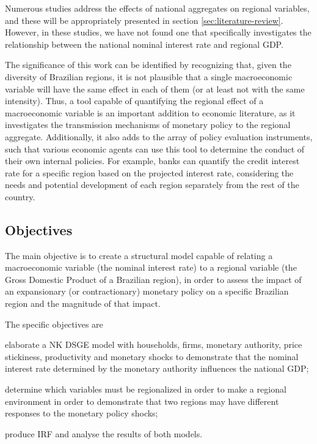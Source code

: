 \documentclass[
	thesis.tex
	]{subfiles}
\begin{document}
	Numerous studies address the effects of national aggregates on regional variables, and these will be appropriately presented in section \ref{sec:literature-review}. However, in these studies, we have not found one that specifically investigates the relationship between the national nominal interest rate and regional GDP.
	
	The significance of this work can be identified by recognizing that, given the diversity of Brazilian regions, it is not plausible that a single macroeconomic variable will have the same effect in each of them (or at least not with the same intensity). Thus, a tool capable of quantifying the regional effect of a macroeconomic variable is an important addition to economic literature, as it investigates the transmission mechanisms of monetary policy to the regional aggregate. Additionally, it also adds to the array of policy evaluation instruments, such that various economic agents can use this tool to determine the conduct of their own internal policies. For example, banks can quantify the credit interest rate for a specific region based on the projected interest rate, considering the needs and potential development of each region separately from the rest of the country.

	\subsection*{Objectives}
	
	The main objective is to create a structural model capable of relating a macroeconomic variable (the nominal interest rate) to a regional variable (the Gross Domestic Product of a Brazilian region), in order to assess the impact of an expansionary (or contractionary) monetary policy on a specific Brazilian region and the magnitude of that impact.
	
	The specific objectives are 
		\begin{enumerate*}[label=(\arabic*)]
			\item elaborate a NK DSGE model with households, firms, monetary authority, price stickiness, productivity and monetary shocks to demonstrate that the nominal interest rate determined by the monetary authority influences the national GDP; 
			\item determine which variables must be regionalized in order to make a regional environment in order to demonstrate that two regions may have different responses to the monetary policy shocks; 
			\item produce IRF and analyse the results of both models.
		\end{enumerate*}
	
\end{document}

